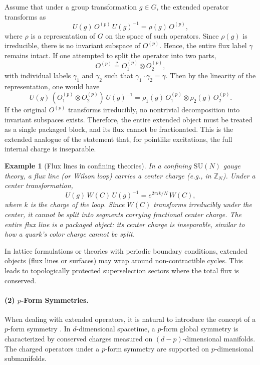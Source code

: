 \documentclass[12pt,a4paper]{article}
\newtheorem{example}{Example}
\begin{document}
Assume that under a group transformation $g\in G$, the extended operator transforms as
\[
U(g)\, O^{(p)}\, U(g)^{-1} = \rho(g)\, O^{(p)},
\]
where $\rho$ is a representation of $G$ on the space of such operators.
Since $\rho(g)$ is irreducible, there is no invariant subspace of $O^{(p)}$.
Hence, the entire flux label $\gamma$ remains intact.
If one attempted to split the operator into two parts,
\[
O^{(p)} \stackrel{?}{=} O_1^{(p)} \otimes O_2^{(p)},
\]
with individual labels $\gamma_1$ and $\gamma_2$ such that $\gamma_1 \cdot \gamma_2 = \gamma$.
Then by the linearity of the representation, one would have
\[
U(g)\,(O_1^{(p)} \otimes O_2^{(p)})\,U(g)^{-1} = \rho_1(g)\,O_1^{(p)} \otimes \rho_2(g)\,O_2^{(p)}.
\]
If the original $O^{(p)}$ transforms irreducibly, no nontrivial decomposition into invariant subspaces exists.
Therefore, the entire extended object must be treated as a single packaged block, and its flux cannot be fractionated.
This is the extended analogue of the statement that, for pointlike excitations, the full internal charge is inseparable.


\begin{example}[Flux lines in confining theories]
	In a confining $\mathrm{SU}(N)$ gauge theory, a flux line (or Wilson loop) carries a center charge (e.g., in $\mathbb{Z}_N$).
	Under a center transformation,
	\[
	U(g)\, W(C)\, U(g)^{-1} = e^{2\pi i k/N}\, W(C),
	\]
	where $k$ is the charge of the loop.
	Since $W(C)$ transforms irreducibly under the center, it cannot be split into segments carrying fractional center charge.
	The entire flux line is a packaged object:
	its center charge is inseparable, similar to how a quark's color charge cannot be split.
\end{example}

In lattice formulations or theories with periodic boundary conditions, extended objects (flux lines or surfaces) may wrap around non-contractible cycles.
This leads to topologically protected superselection sectors where the total flux is conserved.


\paragraph{(2) $p$-Form Symmetries.}
When dealing with extended operators, it is natural to introduce the concept of a $p$-form symmetry \cite{KapustinSeiberg2014,Gaiotto2015,Tachikawa2020,BanksSeiberg2011}. In $d$-dimensional spacetime, a $p$-form global symmetry is characterized by conserved charges measured on $(d-p)$-dimensional manifolds. The charged operators under a $p$-form symmetry are supported on $p$-dimensional submanifolds.
\end{document}
